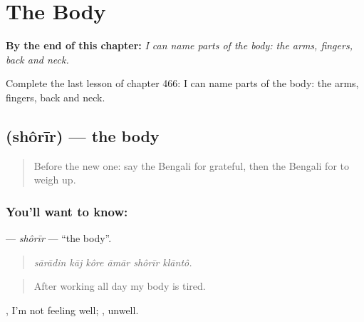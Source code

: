 
\chapter{The Body}
\label{ch:bn-the-body}

\begin{chapteropening}
\textbf{By the end of this chapter:} \emph{I can name parts of the body: the arms, fingers, back and neck.}

Complete the last lesson of chapter 466: I can name parts of the body: the arms, fingers, back and neck.
\end{chapteropening}

\section[\texorpdfstring{\bn{শরীর} (shôrīr)}{শরীর (shôrīr)}]{ (shôrīr) — the body}

\label{lesson:BN-C466-shorir}



\begin{quote}
Before the new one: say the Bengali for grateful, then the Bengali for to weigh up.
\end{quote}

\subsection*{You'll want to know: }
\textbf{} — \emph{shôrīr} — \textquotedblleft{}the body\textquotedblright{}.

\begin{quote}
     
\end{quote}

\begin{quote}
\emph{sārādin kāj kôre āmār shôrīr klāntô.}
\end{quote}

\begin{quote}
After working all day my body is tired.
\end{quote}

  , I'm not feeling well;  , unwell.

